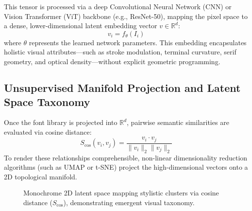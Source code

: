 \documentclass[11pt, onecolumn, a4paper]{article}
\begin{document}
This tensor is processed via a deep Convolutional Neural Network (CNN) or Vision Transformer (ViT) backbone (e.g., ResNet-50), mapping the pixel space to a dense, lower-dimensional latent embedding vector $v \in \mathbb{R}^d$:
\begin{equation}
    v_i = f_{\theta}(I_i)
\end{equation}
where $\theta$ represents the learned network parameters. This embedding encapsulates holistic visual attributes—such as stroke modulation, terminal curvature, serif geometry, and optical density—without explicit geometric programming.

\subsection{Unsupervised Manifold Projection and Latent Space Taxonomy}
Once the font library is projected into $\mathbb{R}^d$, pairwise semantic similarities are evaluated via cosine distance:
\begin{equation}
    S_{\cos}(v_i, v_j) = \frac{v_i \cdot v_j}{\|v_i\|_2 \|v_j\|_2}
\end{equation}
To render these relationships comprehensible, non-linear dimensionality reduction algorithms (such as UMAP or t-SNE) project the high-dimensional vectors onto a 2D topological manifold.

\begin{figure}[htbp]
    \centering
    \caption{Monochrome 2D latent space mapping stylistic clusters via cosine distance ($S_{\cos}$), demonstrating emergent visual taxonomy.}
    \label{fig:latent_space}
\end{figure}
\end{document}
